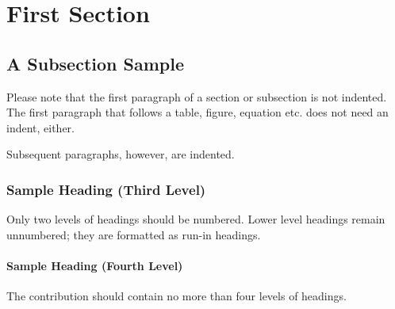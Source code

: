 \documentclass[runningheads]{llncs}
\begin{document}
\section{First Section}
\subsection{A Subsection Sample}

Please note that the first paragraph of a section or subsection is not indented. The first paragraph that follows a table, figure, equation etc. does not need an indent, either.

Subsequent paragraphs, however, are indented.

\subsubsection{Sample Heading (Third Level)}

Only two levels of headings should be numbered. Lower level headings remain unnumbered; they are formatted as run-in headings.

\paragraph{Sample Heading (Fourth Level)}

The contribution should contain no more than four levels of headings.



\end{document}

